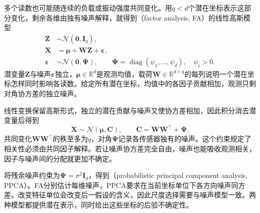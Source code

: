 多个读数也可能随连续的负载或振动强度共同变化。用$q<d$个潜在坐标表示这部分变化，剩余各维由独有噪声解释，就得到（factor analysis, FA）的线性高斯模型
\begin{equation}
  \label{eq:pgm-static-directed-fa}
  \begin{aligned}
    \bm{Z}&\sim\mathcal{N}(\bm{0},\bm{I}_q),\\
    \bm{X}&=\bm{\mu}+\bm{W}\bm{Z}+\bm{\varepsilon},\\
    \bm{\varepsilon}&\sim\mathcal{N}(\bm{0},\bm{\Psi}),\qquad
    \bm{\Psi}=\operatorname{diag}(\psi_1,\ldots,\psi_d),
    \quad\psi_i>0.
  \end{aligned}
\end{equation}
潜变量$\bm Z$与噪声$\bm\varepsilon$独立，$\bm\mu\in\mathbb R^d$是观测均值，载荷$\bm W\in\mathbb R^{d\times q}$的每列说明一个潜在坐标怎样同时影响各读数。给定所有潜在坐标，均值中的各因子贡献相加，观测只剩对角协方差的独立噪声。

线性变换保留高斯形式，独立的潜在贡献与噪声又使协方差相加，因此积分消去潜变量后得到
\begin{equation}
  \label{eq:pgm-static-directed-fa-marginal}
  \bm{X}\sim\mathcal{N}(\bm{\mu},\bm{C}),\qquad
  \bm{C}=\bm{W}\bm{W}^{\top}+\bm{\Psi}.
\end{equation}
共同变化$\bm W\bm W^\top$的秩至多为$q$，对角$\bm\Psi$记录各传感器独有的噪声。这个约束规定了相关性必须由共同因子解释。若让噪声协方差完全自由，噪声也能吸收观测相关，因子与噪声间的分配就更加不确定。

将残余噪声约束为$\bm\Psi=\sigma^2\bm I_d$，得到（probabilistic principal component analysis, PPCA）。FA分别估计每维噪声，PPCA要求在当前坐标单位下各方向噪声同方差。改变特征单位会改变后一假设的含义，因此尺度选择需要与噪声模型一致。两种模型都提供潜在表示，同时给出这些坐标的后验不确定性。

